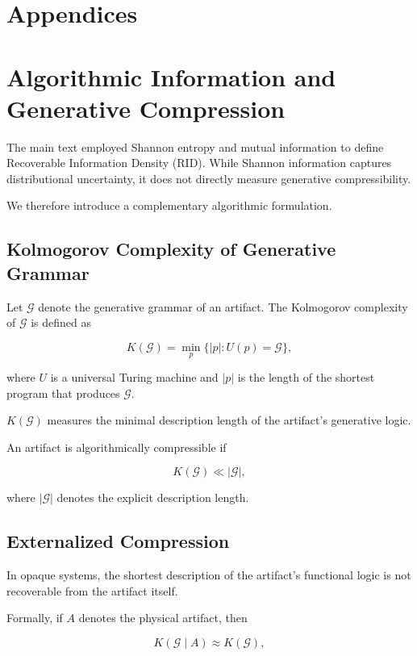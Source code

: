 \documentclass[11pt]{article}
\begin{document}
\newpage
\section*{Appendices}

\appendix

\section{Algorithmic Information and Generative Compression}

The main text employed Shannon entropy and mutual information
to define Recoverable Information Density (RID). While Shannon
information captures distributional uncertainty, it does not
directly measure generative compressibility.

We therefore introduce a complementary algorithmic formulation.

\subsection{Kolmogorov Complexity of Generative Grammar}

Let $\mathcal{G}$ denote the generative grammar of an artifact.
The Kolmogorov complexity of $\mathcal{G}$ is defined as

\[
K(\mathcal{G}) = \min_{p} \{ |p| : U(p) = \mathcal{G} \},
\]

where $U$ is a universal Turing machine and $|p|$ is the length
of the shortest program that produces $\mathcal{G}$.

$K(\mathcal{G})$ measures the minimal description length of the
artifact’s generative logic.

An artifact is algorithmically compressible if

\[
K(\mathcal{G}) \ll |\mathcal{G}|,
\]

where $|\mathcal{G}|$ denotes the explicit description length.

\subsection{Externalized Compression}

In opaque systems, the shortest description of the artifact’s
functional logic is not recoverable from the artifact itself.

Formally, if $A$ denotes the physical artifact, then

\[
K(\mathcal{G} \mid A) \approx K(\mathcal{G}),
\]
\end{document}
